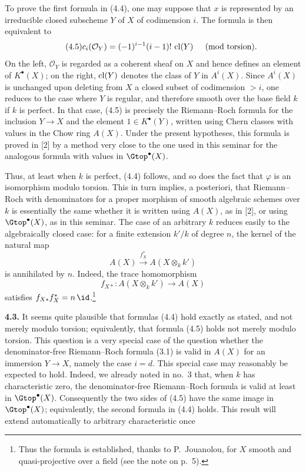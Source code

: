 To prove the first formula in (4.4), one may suppose that $x$ is represented
by an irreducible closed subscheme $Y$ of $X$ of codimension $i$. The formula
is then equivalent to
\begin{equation*}\tag{4.5}
 c_i(\mathcal O_Y)=(-1)^{i-1}(i-1)!\,\operatorname{cl}(Y)
   \quad\pmod{\text{torsion}}.
\end{equation*}
On the left, $\mathcal O_Y$ is regarded as a coherent sheaf on $X$ and hence
defines an element of $K^\bullet(X)$; on the right, $\operatorname{cl}(Y)$ denotes the
class of $Y$ in $A^i(X)$. Since $A^i(X)$ is unchanged upon deleting from
$X$ a closed subset of codimension $>i$, one reduces to the case where $Y$
is regular, and therefore smooth over the base field $k$ if $k$ is perfect.
In that case, (4.5) is precisely the Riemann--Roch formula for the inclusion
$Y\to X$ and the element $1\in K^\bullet(Y)$, written using Chern classes
with values in the Chow ring $A(X)$. Under the present hypotheses, this
formula is proved in [2] by a method very close to the one used in this
seminar for the analogous formula with values in $\Gtop^\bullet(X)$.

Thus, at least when $k$ is perfect, (4.4) follows, and so does the fact that
$\varphi$ is an isomorphism modulo torsion. This in turn implies, a
posteriori, that Riemann--Roch with denominators for a proper morphism of
smooth algebraic schemes over $k$ is essentially the same whether it is
written using $A(X)$, as in [2], or using $\Gtop^\bullet(X)$, as in this
seminar. The case of an arbitrary $k$ reduces easily to the algebraically
closed case: for a finite extension $k'/k$ of degree $n$, the kernel of the
natural map
\[
 A(X)\xrightarrow{f_X^*}A(X\otimes_k k')
\]
is annihilated by $n$. Indeed, the trace homomorphism
\[
 f_{X*}:A(X\otimes_k k')\longrightarrow A(X)
\]
satisfies $f_{X*}f_X^*=n\,\id$.\footnote{Thus the formula is established,
thanks to P.~Jouanolou, for $X$ smooth and quasi-projective over a field (see
the note on p.~5).}

\noindent\textbf{4.3.}
It seems quite plausible that formulas (4.4) hold exactly as stated, and not
merely modulo torsion; equivalently, that formula (4.5) holds not merely
modulo torsion. This question is a very special case of the question whether
the denominator-free Riemann--Roch formula (3.1) is valid in $A(X)$ for an
immersion $Y\to X$, namely the case $i=d$. This special case may reasonably
be expected to hold. Indeed, we already noted in no.~3 that, when $k$ has
characteristic zero, the denominator-free Riemann--Roch formula is valid at
least in $\Gtop^\bullet(X)$. Consequently the two sides of (4.5) have the
same image in $\Gtop^\bullet(X)$; equivalently, the second formula in (4.4)
holds. This result will extend automatically to arbitrary characteristic
once


